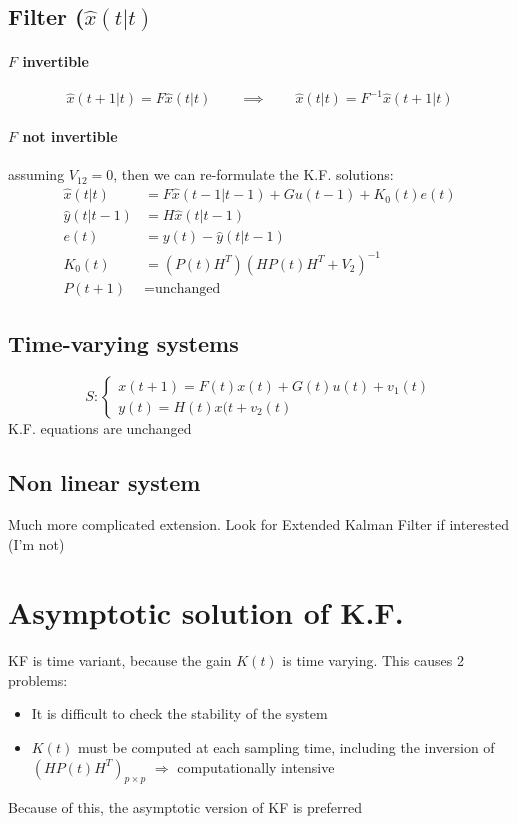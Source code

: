\documentclass{report}
\begin{document}
\subsection{Filter ($\hat{x}(t|t)$}
\paragraph{$F$ invertible}
\[
\hat{x}(t+1|t)=F\hat{x}(t|t)
\qquad\implies\qquad
\hat{x}(t|t)=F^{-1}\hat{x}(t+1|t)
\]
\paragraph{$F$ not invertible} assuming $V_{12}=0$, then we can re-formulate the K.F. solutions:
\begin{align*}
\hat{x}(t|t)&=F\hat{x}(t-1|t-1)+Gu(t-1)+K_0(t)e(t)\\
\hat{y}(t|t-1)&=H\hat{x}(t|t-1)\\
e(t)&=y(t)-\hat{y}(t|t-1)\\
K_0(t)&=\left(P(t)H^T\right)\left(HP(t)H^T+V_2\right)^{-1}\\
P(t+1)&=\text{unchanged }
\end{align*}
\subsection{Time-varying systems}
\[
S:\begin{cases}
x(t+1)=F(t)x(t)+G(t)u(t)+v_1(t)\\
y(t)=H(t)x(t+v_2(t)
\end{cases}
\]
K.F. equations are unchanged
\subsection{Non linear system}
Much more complicated extension. Look for Extended Kalman Filter if interested (I'm not)

\section{Asymptotic solution of K.F.}
KF is time variant, because the gain $K(t)$ is time varying. This causes 2 problems:
\begin{itemize}
\item It is difficult to check the stability of the system
\item $K(t)$ must be computed at each sampling time, including the inversion of $\left(HP(t)H^T\right)_{p\times p}$ $\Rightarrow$ computationally intensive
\end{itemize}
Because of this, the asymptotic version of KF is preferred
\end{document}
